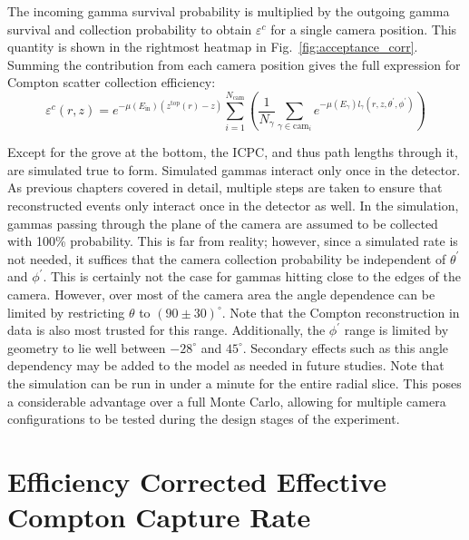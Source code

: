 The incoming gamma survival probability is multiplied by the outgoing gamma survival and collection probability to obtain $\varepsilon^c$ for a single camera position. This quantity is shown in the rightmost heatmap in Fig.~\ref{fig:acceptance_corr}.
Summing the contribution from each camera position gives the full expression for Compton scatter collection efficiency:
\begin{equation}
	\varepsilon^{c}(r,z) = e^{-\mu(E_\text{in})(z^\text{top}(r) - z)}\sum_{i = 1}^{N_\text{cam}}\left(\frac{1}{N_\gamma}\sum_{\gamma\in\text{cam}_i}e^{-\mu(E_\gamma)l_\gamma(r,z,\theta^\prime,\phi^\prime)}\right)
	\label{eq:compton_eff}
\end{equation}

Except for the grove at the bottom, the ICPC, and thus path lengths through it, are simulated true to form. Simulated gammas interact only once in the detector. As previous chapters covered in detail, multiple steps are taken to ensure that reconstructed events only interact once in the detector as well. In the simulation, gammas passing through the plane of the camera are assumed to be collected with 100\% probability. This is far from reality; however, since a simulated rate is not needed, it suffices that the camera collection probability be independent of $\theta^\prime$ and $\phi^\prime$. This is certainly not the case for gammas hitting close to the edges of the camera. However, over most of the camera area the angle dependence can be limited by restricting $\theta$ to $(90\pm30)^\circ$. Note that the Compton reconstruction in data is also most trusted for this range. Additionally, the $\phi^\prime$ range is limited by geometry to lie well between $-28^\circ$ and $45^\circ$. Secondary effects such as this angle dependency may be added to the model as needed in future studies. Note that the simulation can be run in under a minute for the entire radial slice. This poses a considerable advantage over a full Monte Carlo, allowing for multiple camera configurations to be tested during the design stages of the experiment. 

\section{Efficiency Corrected Effective Compton Capture Rate}

